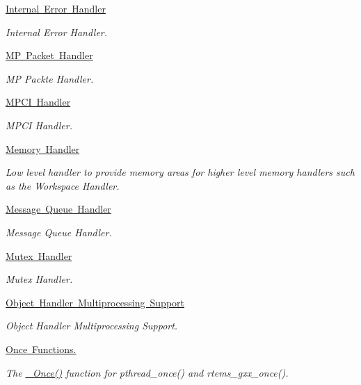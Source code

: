 \begin{DoxyCompactItemize}
\mbox{\hyperlink{group__RTEMSScoreIntErr}{Internal Error Handler}}
\begin{DoxyCompactList}\small\item\em Internal Error Handler. \end{DoxyCompactList}\item 
\mbox{\hyperlink{group__RTEMSScoreMPPacket}{M\+P Packet Handler}}
\begin{DoxyCompactList}\small\item\em MP Packte Handler. \end{DoxyCompactList}\item 
\mbox{\hyperlink{group__RTEMSScoreMPCI}{M\+P\+C\+I Handler}}
\begin{DoxyCompactList}\small\item\em M\+P\+CI Handler. \end{DoxyCompactList}\item 
\mbox{\hyperlink{group__RTEMSScoreMemory}{Memory Handler}}
\begin{DoxyCompactList}\small\item\em Low level handler to provide memory areas for higher level memory handlers such as the Workspace Handler. \end{DoxyCompactList}\item 
\mbox{\hyperlink{group__RTEMSScoreMessageQueue}{Message Queue Handler}}
\begin{DoxyCompactList}\small\item\em Message Queue Handler. \end{DoxyCompactList}\item 
\mbox{\hyperlink{group__RTEMSScoreMutex}{Mutex Handler}}
\begin{DoxyCompactList}\small\item\em Mutex Handler. \end{DoxyCompactList}\item 
\mbox{\hyperlink{group__RTEMSScoreObjectMP}{Object Handler Multiprocessing Support}}
\begin{DoxyCompactList}\small\item\em Object Handler Multiprocessing Support. \end{DoxyCompactList}\item 
\mbox{\hyperlink{group__RTEMSScoreOnce}{Once Functions.}}
\begin{DoxyCompactList}\small\item\em The \mbox{\hyperlink{group__RTEMSScoreOnce_ga2db8aad33d5d118be8a81b4b32caea85}{\+\_\+\+Once()}} function for pthread\+\_\+once() and rtems\+\_\+gxx\+\_\+once(). \end{DoxyCompactList}\item 

\end{DoxyCompactItemize}
